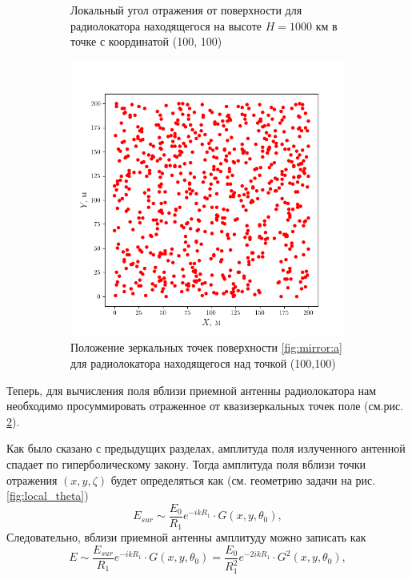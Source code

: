 \begin{figure}[h]
\begin{subfigure}{.49\linewidth}
        \caption{Локальный угол отражения от поверхности для радиолокатора
        находящегося на высоте $H=1000$ км в точке с координатой (100, 100)}
        \label{fig:mirror:b}
    \end{subfigure}
    \begin{subfigure}{.49\linewidth}
        \centering
        \includegraphics[width=\linewidth]{fig/impulse/fig3}
        \caption{Положение зеркальных точек поверхности \ref{fig:mirror:a} для
        радиолокатора находящегося над точкой (100,100) }
        \label{fig:mirror:c}
    \end{subfigure}
    \label{fig:mirror}
    \caption{}
\end{figure}

Теперь, для вычисления поля вблизи приемной антенны радиолокатора нам
необходимо просуммировать отраженное от квазизеркальных точек поле
(см.рис. \ref{fig:mirror:c}).  


Как было сказано с предыдущих разделах, амплитуда поля излученного антенной
спадает по гиперболическому закону. Тогда амплитуда поля вблизи точки отражения
$(x,y,\zeta)$
будет определяться как (см. геометрию задачи на рис. \ref{fig:local_theta})
\begin{equation}
    \label{eq:}
    E_{sur} \sim \frac{E_0}{R_1} e^{-ikR_1} \cdot G(x,y,\theta_0), 
\end{equation}
Следовательно, вблизи приемной антенны амплитуду можно записать как
\begin{equation}
    \label{eq:E}
    E \sim \frac{E_{sur}}{R_1} e^{-ikR_1} \cdot G(x,y,\theta_0) =
    \frac{E_0}{R_1^2} e^{-2ikR_1} \cdot G^2(x,y,\theta_0), 
\end{equation}


